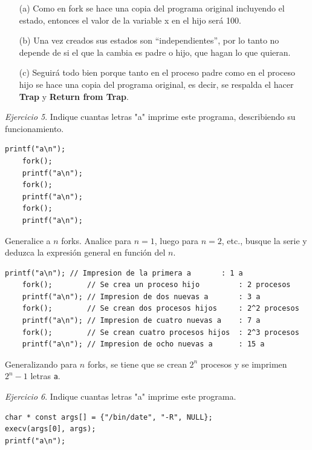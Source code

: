 \documentclass[12pt]{article}
\begin{document}
\begin{rta}
    \begin{itemize}
        \item[(a)] Como en fork se hace una copia del programa original incluyendo el estado, entonces el valor de la variable x en el hijo será 100.
        \item[(b)] Una vez creados sus estados son “independientes”, por lo tanto no depende de si el que la cambia es padre o hijo, que hagan lo que quieran.
        \item[(c)] Seguirá todo bien porque tanto en el proceso padre como en el proceso hijo se hace una copia del programa original, es decir, se respalda el hacer \textbf{Trap} y \textbf{Return from Trap}.
    \end{itemize}
\end{rta}

\noindent \textit{Ejercicio 5}. Indique cuantas letras "a" imprime este programa, describiendo su funcionamiento.

\begin{lstlisting}[style=CStyle]
    printf("a\n");
    fork();
    printf("a\n");
    fork();
    printf("a\n");
    fork();
    printf("a\n");
\end{lstlisting}

Generalice a $n$ forks. Analice para $n=1$, luego para $n=2$, etc., busque la serie y deduzca la expresión general en función del $n$.

\begin{rta}
    \begin{lstlisting}[style=CStyle]
    printf("a\n"); // Impresion de la primera a       : 1 a
    fork();        // Se crea un proceso hijo         : 2 procesos
    printf("a\n"); // Impresion de dos nuevas a       : 3 a
    fork();        // Se crean dos procesos hijos     : 2^2 procesos
    printf("a\n"); // Impresion de cuatro nuevas a    : 7 a
    fork();        // Se crean cuatro procesos hijos  : 2^3 procesos
    printf("a\n"); // Impresion de ocho nuevas a      : 15 a
    \end{lstlisting}
    Generalizando para $n$ forks, se tiene que se crean $2^n$ procesos y se imprimen $2^n-1$ letras \texttt{a}.
\end{rta}

\noindent \textit{Ejercicio 6}. Indique cuantas letras "a" imprime este programa.

\begin{lstlisting}[style=CStyle]
char * const args[] = {"/bin/date", "-R", NULL};
execv(args[0], args);
printf("a\n");
\end{lstlisting}
\end{document}

